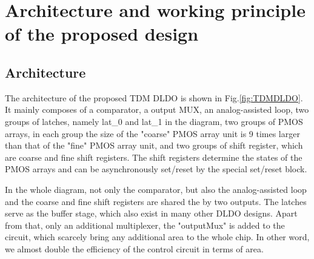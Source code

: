 \documentclass[journal]{IEEEtran}
\begin{document}
\section{Architecture and working principle of the proposed design}
\subsection{Architecture}
The architecture of the proposed TDM DLDO is shown in Fig.\ref{fig:TDMDLDO}. It mainly composes of a comparator, a output MUX, an analog-assisted loop, two groups of latches, namely lat\_0 and lat\_1 in the diagram, two groups of PMOS arrays, in each group the size of the "coarse" PMOS array unit is 9 times larger than that of the "fine" PMOS array unit, and two groups of shift register, which are coarse and fine shift registers. The shift registers determine the states of the PMOS arrays and can be asynchronously set/reset by the special set/reset block.  

In the whole diagram, not only the comparator, but also the analog-assisted loop and the coarse and fine shift registers are shared the by two outputs. The latches serve as the buffer stage, which also exist in many other DLDO designs\cite{AALDO,AALDO1}. Apart from that, only an additional multiplexer, the "outputMux" is added to the circuit, which scarcely bring any additional area to the whole chip. In other word, we almost double the efficiency of the control circuit in terms of area.
\end{document}
